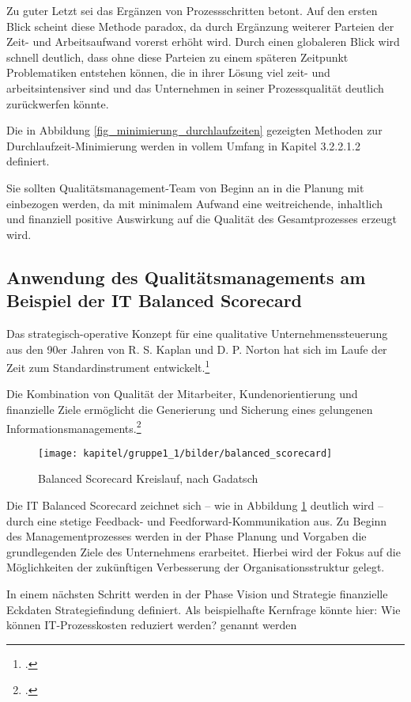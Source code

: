 Zu guter Letzt sei das Ergänzen von Prozessschritten betont. Auf den ersten Blick scheint diese Methode paradox, da durch Ergänzung weiterer Parteien der Zeit- und Arbeitsaufwand vorerst erhöht wird. Durch einen globaleren Blick wird schnell deutlich, dass ohne diese Parteien zu einem späteren Zeitpunkt Problematiken entstehen können, die in ihrer Lösung viel zeit- und arbeitsintensiver sind und das Unternehmen in seiner Prozessqualität deutlich zurückwerfen könnte.

Die in Abbildung \ref{fig_minimierung_durchlaufzeiten} gezeigten Methoden zur Durchlaufzeit-Minimierung werden in vollem Umfang in Kapitel 3.2.2.1.2 definiert.

Sie sollten Qualitätsmanagement-Team von Beginn an in die Planung mit einbezogen werden, da mit minimalem Aufwand eine weitreichende, inhaltlich und finanziell positive Auswirkung auf die Qualität des Gesamtprozesses erzeugt wird. 

\subsection{Anwendung des Qualitätsmanagements am Beispiel der IT Balanced Scorecard}
Das strategisch-operative Konzept für eine qualitative Unternehmenssteuerung aus den 90er Jahren von R. S. 
Kaplan und D. P. Norton hat sich im Laufe der Zeit zum Standardinstrument 
entwickelt.\footcite{friedag_scorecard_2004}

Die Kombination von Qualität der Mitarbeiter, Kundenorientierung und finanzielle Ziele ermöglicht die 
Generierung und Sicherung eines gelungenen Informationsmanagements.\footcite{gabriel_inm_2003}

\begin{figure}[h!]
	\centering
	\texttt{[image: kapitel/gruppe1\_1/bilder/balanced\_scorecard]}
	\caption{Balanced Scorecard Kreislauf, nach Gadatsch}
	\label{fig_balanced_scorecard_cycle}
\end{figure}
\newpage

Die IT Balanced Scorecard zeichnet sich – wie in Abbildung \ref{fig_balanced_scorecard_cycle} deutlich wird – durch eine stetige Feedback- und Feedforward-Kommunikation aus. 
Zu Beginn des Managementprozesses werden in der Phase \glqq Planung und Vorgaben\grqq{} die 
grundlegenden Ziele des Unternehmens erarbeitet. Hierbei wird der Fokus auf die Möglichkeiten der 
zukünftigen Verbesserung der Organisationsstruktur gelegt.

In einem nächsten Schritt werden in der Phase \glqq Vision und Strategie\grqq{} finanzielle Eckdaten 
Strategiefindung definiert. Als beispielhafte Kernfrage könnte hier: \glqq Wie können IT-Prozesskosten reduziert werden?\grqq{} genannt werden

